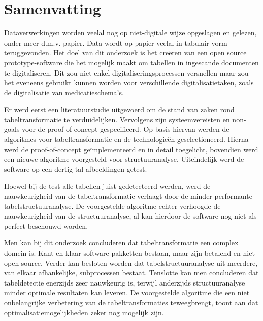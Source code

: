 
%
%


\chapter{Samenvatting}

Dataverwerkingen worden veelal nog op niet-digitale wijze opgeslagen en gelezen, onder meer d.m.v. papier. Data wordt op papier veelal in tabulair vorm teruggevonden. Het doel van dit onderzoek is het creëren van een open source prototype-software die het mogelijk maakt om tabellen in ingescande documenten te digitaliseren. Dit zou niet enkel digitaliseringsprocessen versnellen maar zou het eveneens gebruikt kunnen worden voor verschillende digitalisatietaken, zoals de digitalisatie van medicatieschema's.

Er werd eerst een literatuurstudie uitgevoerd om de stand van zaken rond tabeltransformatie te verduidelijken. Vervolgens zijn systeemvereisten en non-goals voor de proof-of-concept gespecifieerd. Op basis hiervan werden de algoritmes voor tabeltransformatie en de technologieën geselectioneerd. Hierna werd de proof-of-concept geïmplementeerd en in detail toegelicht, bovendien werd een nieuwe algoritme voorgesteld voor structuuranalyse. Uiteindelijk werd de software op een dertig tal afbeeldingen getest.

Hoewel bij de test alle tabellen juist gedetecteerd werden, werd de nauwkeurigheid van de tabeltransformatie verlaagt door de minder performante tabelstructuuranalyse. De voorgestelde algoritme echter verhoogde de nauwkeurigheid van de structuuranalyse, al kan hierdoor de software nog niet als perfect beschouwd worden.

Men kan bij dit onderzoek concluderen dat tabeltransformatie een complex domein is. Kant en klaar software-pakketten bestaan, maar zijn betalend en niet open source. Verder kan besloten worden dat tabelstructuuranalyse uit meerdere, van elkaar afhankelijke, subprocessen bestaat. Tenslotte kan men concluderen dat tabeldetectie enerzijds zeer nauwkeurig is, terwijl anderzijds structuuranalyse minder optimale resultaten kan leveren. De voorgestelde algoritme die een niet onbelangrijke verbetering van de tabeltransformaties teweegbrengt, toont aan dat optimalisatiemogelijkheden zeker nog mogelijk zijn.
